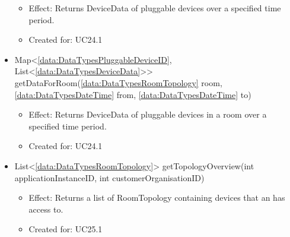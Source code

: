 \begin{description}
\begin{itemize}[noitemsep,nolistsep,leftmargin=-.25cm]
        \begin{itemize}[noitemsep,nolistsep]
           \item Effect: Returns DeviceData of pluggable devices over a specified time period.
\item Created for: UC24.1
        \end{itemize}
      \item \textsf{Map\textless{}\ref{data:DataTypesPluggableDeviceID}, List\textless{}\ref{data:DataTypesDeviceData}\textgreater{}\textgreater{} getDataForRoom(\ref{data:DataTypesRoomTopology} room, \ref{data:DataTypesDateTime} from, \ref{data:DataTypesDateTime} to)}
        \begin{itemize}[noitemsep,nolistsep]
           \item Effect: Returns DeviceData of pluggable devices in a room over a specified time period.
\item Created for: UC24.1
        \end{itemize}
      \item \textsf{List\textless{}\ref{data:DataTypesRoomTopology}\textgreater{} getTopologyOverview(int applicationInstanceID, int customerOrganisationID)}
        \begin{itemize}[noitemsep,nolistsep]
           \item Effect: Returns a list of RoomTopology containing devices that an  has access to.
\item Created for: UC25.1
        \end{itemize}
    \end{itemize}
    \end{description}

